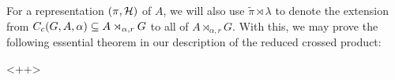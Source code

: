 For a representation $(\pi,\mathcal{H})$ of $A$, we will also use $\tilde \pi \rtimes \lambda$ to denote the extension from $C_c(G,A,\alpha)\subseteq A \rtimes_{\alpha,r}G$ to all of $A \rtimes_{\alpha, r} G$. With this, we may prove the following essential theorem in our description of the reduced crossed product:
\begin{theorem}
	
	\label{mult:reducedfaithful}
\end{theorem}<++>
